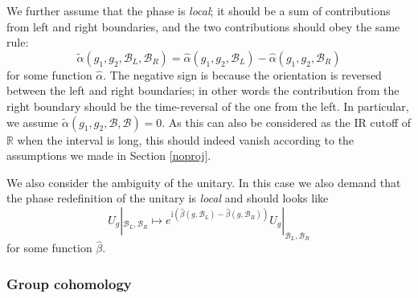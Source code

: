\documentclass[
]{scrartcl}
\numberwithin{equation}{section}
\theoremstyle{definition}
\theoremstyle{definition}
\theoremstyle{definition}
\theoremstyle{definition}
\theoremstyle{remark}
\begin{document}
We further assume that the phase is \emph{local}; it should be a sum of contributions from left and right boundaries, and the two contributions should obey the same rule:
\begin{equation}
    \label{eq:alphasplit}
    \tilde{\alpha}(g_1,g_2,\mathcal{B}_L,\mathcal{B}_R)
    =
    \hat{\alpha}(g_1,g_2,\mathcal{B}_L) - \hat{\alpha}(g_1,g_2,\mathcal{B}_R)
\end{equation}
for some function \(\hat\alpha\). The negative sign is because the orientation is reversed between the left and right boundaries; in other words the contribution from the right boundary should be the time-reversal of the one from the left.
In particular, we assume \(\tilde{\alpha}(g_1,g_2,\mathcal{B},\mathcal{B}) = 0\). As this can also be considered as the IR cutoff of \(\mathbb{R}\) when the interval is long, this should indeed vanish according to the assumptions we made in Section \ref{noproj}.

We also consider the ambiguity of the unitary.
In this case we also demand that the phase redefinition of the unitary is \emph{local} and should looks like
\begin{equation}
    \label{eq:UBbeta}
    U_g|_{\mathcal{B}_L,\mathcal{B}_R} \mapsto e^{\mathrm{i}(\hat\beta(g,\mathcal{B}_L)-\hat\beta(g,\mathcal{B}_R))} U_g|_{\mathcal{B}_L,\mathcal{B}_R}
\end{equation}
for some function \(\hat\beta\).

\hypertarget{group-cohomology}{%
\subsubsection{Group cohomology}\label{group-cohomology}}
\end{document}
